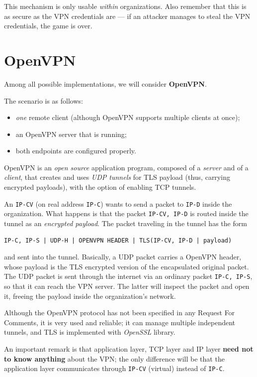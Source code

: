 \documentclass[10pt]{\classname}
\begin{document}
This mechanism is only usable \emph{within} organizations. Also remember that
this is as secure as the VPN credentials are --- if an attacker manages to steal
the VPN credentials, the game is over.

\section{OpenVPN}

Among all possible implementations, we will consider \textbf{OpenVPN}. 

The scenario is as follows:
\begin{itemize}
    \item \emph{one} remote client (although OpenVPN supports multiple clients
        at once);
    \item an OpenVPN server that is running;
    \item both endpoints are configured properly.
\end{itemize}

OpenVPN is an \emph{open source} application program, composed of a
\emph{server} and of a \emph{client}, that creates and uses \emph{UDP tunnels}
for TLS payload (thus, carrying encrypted payloads), with the option of
enabling TCP tunnels.

An \texttt{IP-CV} (on real address \texttt{IP-C}) wants to
send a packet to \texttt{IP-D} inside the organization. What happens is that
the packet \texttt{IP-CV, IP-D} is routed inside the tunnel as an
\emph{encrypted payload}. The packet traveling in the tunnel has the form

\begin{verbatim}
IP-C, IP-S | UDP-H | OPENVPN HEADER | TLS(IP-CV, IP-D | payload)
\end{verbatim}

and sent into the tunnel. Basically, a UDP packet carries a OpenVPN header,
whose payload is the TLS encrypted version of the encapsulated original packet.
The UDP packet is sent through the internet via an ordinary packet
\texttt{IP-C, IP-S}, so that it can reach the VPN server. The latter will
inspect the packet and open it, freeing the payload inside the organization's
network.

Although the OpenVPN protocol has not been specified in any Request For
Comments, it is very used and reliable; it can manage multiple independent
tunnels, and TLS is implemented with \emph{OpenSSL} library.

An important remark is that application layer, TCP layer and IP layer
\textbf{need not to know anything} about the VPN; the only difference will be
that the application layer communicates through \texttt{IP-CV} (virtual)
instead of \texttt{IP-C}.
\end{document}
